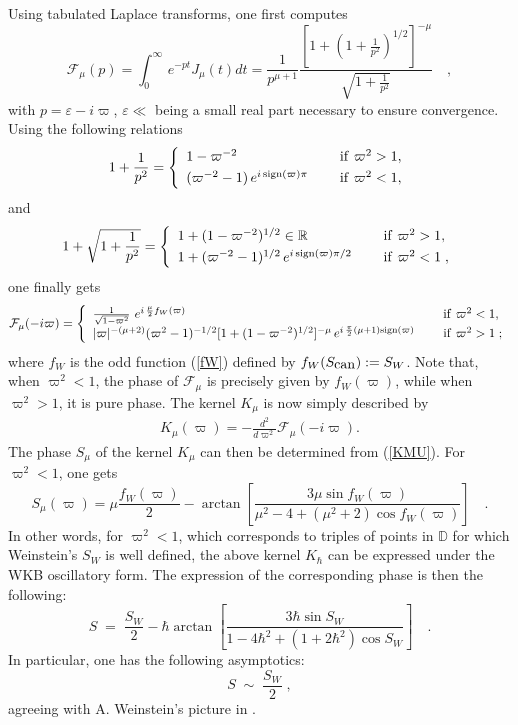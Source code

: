 \documentclass{article}
\def\beq{\begin{eqnarray}}
\def\eeq{\end{eqnarray}}
\def\bearlll{\begin{array}{lll}}
\def\eear{\end{array}}
\newcommand{\DD}{\mathbb D}
\newcommand{\R}{\mathbb R}
\def\beq{\begin{eqnarray}}
\def\eeq{\end{eqnarray}}
\def\m{\mu}
\def \R{{\mathbb R}}
\newcommand{\re}[1]{(\ref{#1})}
\begin{document}
\noindent Using tabulated Laplace transforms, one first computes
\begin{equation}
{\mathcal F}_\m(p)=\int_0^\infty \, e^{-pt} J_\mu (t) dt =
\frac{1}{p^{\mu +1}}
\frac{[1+(1+\frac{1}{p^2})^{1/2}]^{-\mu}}{\sqrt{1+\frac{1}{p^2}}}
\quad ,
\end{equation}
with $p=\varepsilon - i \varpi$, $\varepsilon \ll$ being a small
real part necessary to ensure convergence.
Using the following relations
\begin{equation} 1 + \frac{1}{p^2}  = \left\{ \bearlll
  1- \varpi^{-2} &\;& {\rm if}\ \varpi^2 >1 ,  \\[.3em]
  (\varpi^{-2} -1) \,{e}^{i \,\rm{sign}(\varpi)\pi} &\;& {\rm if}\ \varpi^2 < 1 ,  \eear\right .
\end{equation}
and 
\begin{equation} 1 + \sqrt{1 + \frac{1}{p^2}}  = \left\{ \bearlll
 1+ (1- \varpi^{-2})^{1/2} \in \R &\;& {\rm if}\ \varpi^2 >1 ,  \\[.3em]
 1+  (\varpi^{-2} -1)^{1/2} \,{e}^{i \,\rm{sign}(\varpi)\pi/2} &\;& {\rm if}\ \varpi^2 < 1 \;,  \eear\right .
\end{equation}
one finally gets
\begin{equation}
 {\mathcal F}_\m(-i \varpi)  = \left\{ \bearlll
 \frac{1}{\sqrt{1-\varpi^2}}\,\, e^{i \, \frac{\mu}{2}
f_W(\varpi)} &\;& {\rm if}\ \varpi^2 < 1 ,  \\[.3em]
  |\varpi|^{-(\m+2)} (\varpi^2 - 1)^{-1/2} [1+ (1- \varpi^{-2})^{1/2}]^{-\m} \,{e}^{i\, \frac{\pi}{2} (\m + 1) \rm{sign}(\varpi)} &\;& {\rm if}\ \varpi^2 > 1 \;;  \eear\right .
\end{equation}
where $f_W$ is the odd function  (\ref{fW}) defined by $f_W(S_{\mbox{\rm can}}):=S_W$.
Note that, when $\varpi^2 < 1$, the phase of ${\mathcal F}_\m$ is precisely given by $f_W(\varpi)$, while when $\varpi^2 > 1$, it is pure phase. The kernel $K_\mu$ is now simply described  by
\beq \label{KMU}
  K_\mu (\varpi) = -\frac{d^2}{d\varpi^2}{\mathcal F}_\m(-i \varpi).
\eeq
\noindent The phase $S_\mu$ of the kernel $K_\m$ can then be determined from \re{KMU}. For $\varpi^2 <1$, one gets
\begin{equation}\label{PhaseK}
S_\mu(\varpi) = \mu \frac{f_W(\varpi)}{2} - \arctan [\frac{ 3
 \mu \sin f_W(\varpi)}{\mu^2 -4 + (\mu^2+2) \cos
 f_W(\varpi)}] \quad .
\end{equation}
\noindent In other words, for $\varpi^2 <1$, which corresponds to triples of points in $\DD$ for which Weinstein's $S_W$
is well defined,  the above kernel $K_\hbar$ can be expressed under the WKB oscillatory form. The expression
of the corresponding phase is then the following:
\begin{equation}
S\;= \; \frac{S_W}{2} - \hbar\arctan [\frac{ 3
\hbar\sin S_W}{ 1 -4\hbar^2 + (1+2\hbar^2) \cos
S_W}] \quad .
\end{equation}
In particular, one has the following asymptotics:
\begin{equation*}
S\;\sim\;\frac{S_W}{2} \;,
\end{equation*}
agreeing with  A. Weinstein's picture in \cite{WeinsteinTr}.
\end{document}
